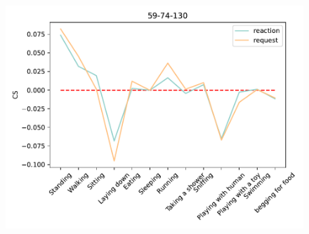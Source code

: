 \begin{figure}[ht]
\begin{minipage}[b]{.3\linewidth}
			\includegraphics[width=0.99\linewidth]{./35word/59-74-130.pdf}
		\end{minipage}
		

\end{figure}
